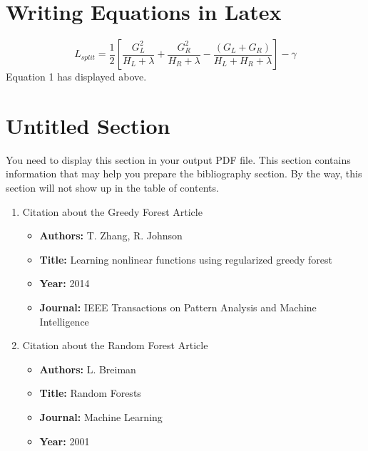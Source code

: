 \documentclass[10pt]{article}
\begin{document}
\section{Writing Equations in Latex}
\begin{equation}
    L_{split}=\frac{1}{2}\left[\frac{G_L^2}{H_L+\lambda}+\frac{G_R^2}{H_R+\lambda}-\frac{(G_L+G_R)}{H_L+H_R+\lambda}\right]-\gamma
\end{equation}
Equation 1 has displayed above.\cite{spec2}
\section*{Untitled Section}
You need to display this section in your output PDF file. This section contains information
that may help you prepare the bibliography section. By the way, this section will not
show up in the table of contents.
    \begin{enumerate}
    \item Citation about the Greedy Forest Article

    \begin{itemize}
        \item \textbf{Authors: }T. Zhang, R. Johnson
        \item \textbf{Title: }Learning nonlinear functions using regularized greedy forest
        \item \textbf{Year: }2014
        \item \textbf{Journal: }IEEE Transactions on Pattern Analysis and Machine Intelligence
    \end{itemize}
    \item Citation about the Random Forest Article
    \begin{itemize}
        \item \textbf{Authors: }L. Breiman
        \item \textbf{Title: }Random Forests
        \item \textbf{Journal: }Machine Learning
        \item \textbf{Year: }2001
    \end{itemize}

    \end{enumerate}
    
    
\end{document}
